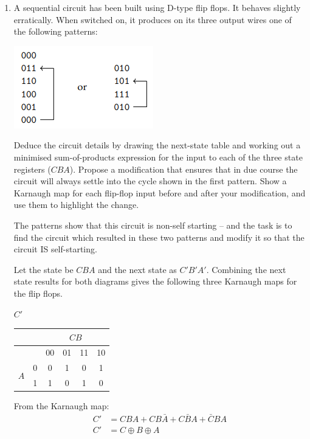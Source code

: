 \documentclass[10pt,\jkfside,a4paper]{article}
\begin{document}
\begin{enumerate}

\item A sequential circuit has been built using D-type flip flops. It 
behaves slightly erratically. When switched on, it produces on its three 
output wires one of the following patterns:\\
\begin{center}
\includegraphics{1x}
\end{center}
Deduce the circuit details by drawing the next-state table and working out 
a minimised sum-of-products expression for the input to each of the three 
state registers ($CBA$). Propose a modification that ensures that in due 
course the circuit will always settle into the cycle shown in the first
pattern. Show a Karnaugh map for each flip-flop input before and after 
your modification, and use them to highlight the change.

The patterns show that this circuit is non-self starting -- and the task is to 
find the circuit which resulted in these two patterns and modify it so that the 
circuit IS self-starting.

Let the state be $CBA$ and the next state as $C'B'A'$.
Combining the next state results for both diagrams gives the following 
three Karnaugh maps for the flip flops.

\begin{center}

{\large $C'$}

\begin{tabular}{|c|c|c|c|c|c|} 
\hline
& & \multicolumn{4}{c|}{$CB$} \\
\hline
& & 00 & 01 & 11 & 10 \\ 
\hline
\multirow{2}{2em}{$A$} 
& 0 & 0 & 1 & 0 & 1 \\
& 1 & 1 & 0 & 1 & 0 \\
\hline
\end{tabular}

From the Karnaugh map:
\begin{equation}
\begin{split}
C' &= CBA + CB\bar A + C\bar BA + \bar CBA\\
C' &= C\oplus B \oplus A\\
\end{split}
\end{equation}


\end{center}
\end{enumerate}
\end{document}
